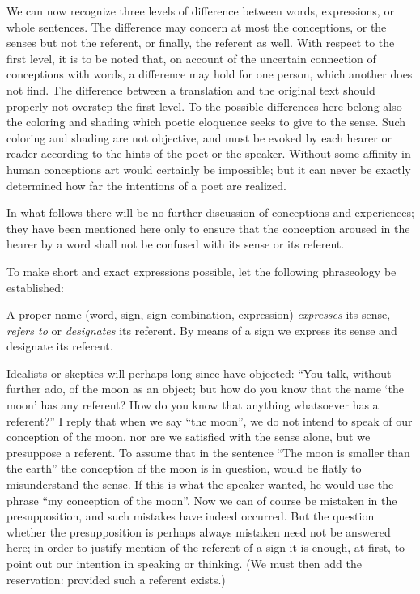 \documentclass[twoside,12pt]{article}
\begin{document}
We can now recognize three levels of difference between words,
expressions, or whole sentences. The difference may concern at most
the conceptions, or the senses but not the referent, or finally, the
referent as well. With respect to the first level, it is to be noted
that, on account of the uncertain connection of conceptions with
words, a difference may hold for one person, which another does not
find. The difference between a translation and the original text
should properly not overstep the first level. To the possible
differences here belong also the coloring and shading which poetic
eloquence seeks to give to the sense. Such coloring and shading are
not objective, and must be evoked by each hearer or reader according
to the hints of the poet or the speaker. Without some affinity in
human conceptions art would certainly be impossible; but it can never
be exactly determined how far the intentions of a poet are realized.

In what follows there will be no further discussion of conceptions and
experiences; they have been mentioned here only to ensure that the
conception aroused in the hearer by a word shall not be confused with
its sense or its referent.

To make short and exact expressions possible, let the following
phraseology be established:

A proper name (word, sign, sign combination, expression)
\emph{expresses} its sense, \emph{refers to} or \emph{designates} its
referent. By means of a sign we express its sense and designate its
referent.

Idealists or skeptics will perhaps long since have objected: ``You
talk, without further ado, of the moon as an object; but how do you
know that the name `the moon' has any referent? How do you know that
anything whatsoever has a referent?'' I reply that when we say ``the
moon'', we do not intend to speak of our conception of the moon, nor
are we satisfied with the sense alone, but we presuppose a referent.
To assume that in the sentence ``The moon is smaller than the earth''
the conception of the moon is in question, would be flatly to
misunderstand the sense. If this is what the speaker wanted, he would
use the phrase ``my conception of the moon''. Now we can of course be
mistaken in the presupposition, and such mistakes have indeed
occurred. But the question whether the presupposition is perhaps
always mistaken need not be answered here; in order to justify mention
of the referent of a sign it is enough, at first, to point out our
intention in speaking or thinking. (We must then add the reservation:
provided such a referent exists.)
\end{document}
